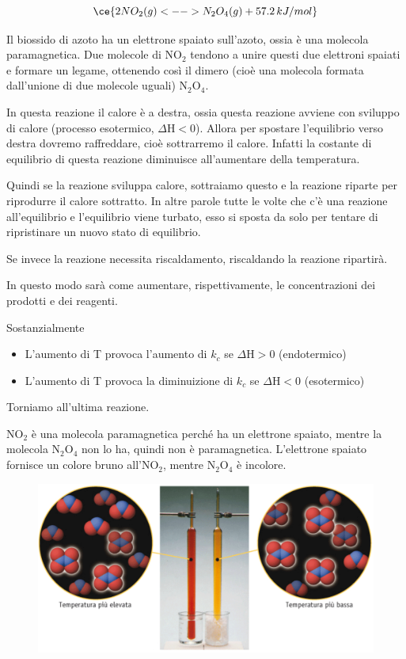 $$\ce{2NO_2(g) <--> N_2O_4(g) + 57.2 \, kJ/mol}$$

Il biossido di azoto ha un elettrone spaiato sull'azoto, ossia è una molecola paramagnetica. Due molecole di NO$_2$ tendono a unire questi due elettroni spaiati e formare un legame, ottenendo così il dimero (cioè una molecola formata dall'unione di due molecole uguali) N$_2$O$_4$.

In questa reazione il calore è a destra, ossia questa reazione avviene con sviluppo di calore (processo esotermico, $\Delta$H$<$0). Allora per spostare l'equilibrio verso destra dovremo raffreddare, cioè sottrarremo il calore. Infatti la costante di equilibrio di questa reazione diminuisce all'aumentare della temperatura.

Quindi se la reazione sviluppa calore, sottraiamo questo e la reazione riparte per riprodurre il calore sottratto. In altre parole tutte le volte che c'è una reazione all'equilibrio e l'equilibrio viene turbato, esso si sposta da solo per tentare di ripristinare un nuovo stato di equilibrio.

Se invece la reazione necessita riscaldamento, riscaldando la reazione ripartirà.

In questo modo sarà come aumentare, rispettivamente, le concentrazioni dei prodotti e dei reagenti.

Sostanzialmente

\begin{itemize}
    \item L'aumento di T provoca l'aumento di $k_c$ se $\Delta$H$>$0 (endotermico)
    \item L'aumento di T provoca la diminuizione di $k_c$ se $\Delta$H$<$0 (esotermico)
\end{itemize}

Torniamo all'ultima reazione.

NO$_2$ è una molecola paramagnetica perché ha un elettrone spaiato, mentre la molecola N$_2$O$_4$ non lo ha, quindi non è paramagnetica. L'elettrone spaiato fornisce un colore bruno all'NO$_2$, mentre N$_2$O$_4$ è incolore.

\begin{figure}[htp]
    \centering
    \includegraphics[width=14cm]{immagini/reazione_NO_2.png}
\end{figure}

